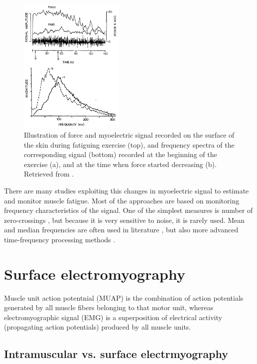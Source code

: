 \begin{figure}[ht]
\centering
\includegraphics[width=0.45\textwidth]{Images/introduction/fatigue.png}
\caption{Illustration of force and myoelectric signal recorded on the surface of the skin during fatiguing exercise (top), and frequency spectra of the corresponding signal (bottom) recorded at the beginning of the exercise (a), and at the time when force started decreasing (b). Retrieved from \citet{DeLuca1984}.}
\label{fig:fatigue}
\end{figure}

There are many studies exploiting this changes in myoelectric signal to estimate and monitor muscle fatigue. Most of the approaches are based on monitoring frequency characteristics of the signal. One of the simplest measures is number of zero-crossings \citep{Hagg1981}, but because it is very sensitive to noise, it is rarely used. Mean and median frequencies are often used in literature \citep{Lindstrom1977, Merletti1997, Stulen1981}, but also more advanced time-frequency processing methods \citep{Knaflitz1999, Cifrek2000, Georgakis2003, Srhoj-Egekher2011a}.


\section{Surface electromyography}

Muscle unit action potentnial (MUAP) is the combination of action potentials generated by all muscle fibers belonging to that motor unit, whereas electromyographic signal (EMG) is a superposition of electrical activity (propagating action potentials) produced by all muscle units. 

\subsection{Intramuscular vs. surface electrmyography}

